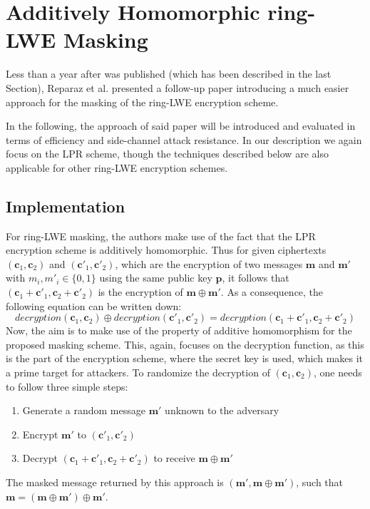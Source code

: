 \chapter{Additively Homomorphic ring-LWE Masking}
Less than a year after \cite{maskedRing} was published (which has been described in the last Section), Reparaz et al. presented a follow-up paper \cite{Reparaz2016} introducing a much easier approach for the masking of the \ac{ring-LWE} encryption scheme.

In the following, the approach of said paper will be introduced and evaluated in terms of efficiency and side-channel attack resistance. In our description we again focus on the \ac{LPR} scheme, though the techniques described below are also applicable for other \ac{ring-LWE} encryption schemes.

\section{Implementation}
For \ac{ring-LWE} masking, the authors make use of the fact that the \ac{LPR} encryption scheme is additively homomorphic. Thus for given ciphertexts \((\textbf{c}_1, \textbf{c}_2)\) and \((\textbf{c}'_1, \textbf{c}'_2)\), which are the encryption of two messages \(\textbf{m}\) and \(\textbf{m}'\) with \(m_i, m'_i \in \{0,1\}\) using the same public key \(\textbf{p}\), it follows that \((\textbf{c}_1+\textbf{c}'_1, \textbf{c}_2+\textbf{c}'_2)\) is the encryption of \(\textbf{m} \oplus \textbf{m}'\). As a consequence, the following equation can be written down:
\begin{equation}
	decryption(\textbf{c}_1,\textbf{c}_2) \oplus decryption(\textbf{c}'_1,\textbf{c}'_2) = decryption(\textbf{c}_1 + \textbf{c}'_1,\textbf{c}_2 + \textbf{c}'_2)
\end{equation}
Now, the aim is to make use of the property of additive homomorphism for the proposed masking scheme. This, again, focuses on the decryption function, as this is the part of the encryption scheme, where the secret key is used, which makes it a prime target for attackers. To randomize the decryption of \((\textbf{c}_1, \textbf{c}_2)\), one needs to follow three simple steps:
\begin{enumerate}
\item Generate a random message \(\textbf{m}'\) unknown to the adversary
\item Encrypt \(\textbf{m}'\) to \((\textbf{c}'_1, \textbf{c}'_2)\)
\item Decrypt \((\textbf{c}_1+\textbf{c}'_1, \textbf{c}_2+\textbf{c}'_2)\) to receive \(\textbf{m} \oplus \textbf{m}'\)
\end{enumerate}
The masked message returned by this approach is \((\textbf{m}', \textbf{m} \oplus \textbf{m}')\), such that \(\textbf{m} = (\textbf{m} \oplus \textbf{m}') \oplus \textbf{m}'\).

